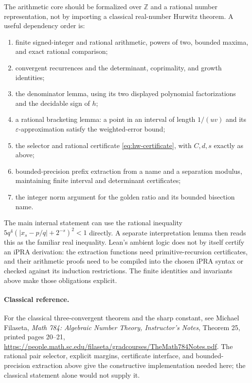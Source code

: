 The arithmetic core should be formalized over \(\mathbb Z\) and a rational
number representation, not by importing a classical real-number Hurwitz
theorem.  A useful dependency order is:
\begin{enumerate}
\item finite signed-integer and rational arithmetic, powers of two, bounded
      maxima, and exact rational comparison;
\item convergent recurrences and the determinant, coprimality, and growth
      identities;
\item the denominator lemma, using its two displayed polynomial
      factorizations and the decidable sign of \(h\);
\item a rational bracketing lemma: a point in an interval of length \(1/(uv)\)
      and its \(\varepsilon\)-approximation satisfy the weighted-error bound;
\item the selector and rational certificate \eqref{eq:hw-certificate}, with
      \(C,d,s\) exactly as above;
\item bounded-precision prefix extraction from a name and a separation
      modulus, maintaining finite interval and determinant certificates;
\item the integer norm argument for the golden ratio and its bounded
      bisection name.
\end{enumerate}
The main internal statement can use the rational inequality
\(5q^4(|x_s-p/q|+2^{-s})^2<1\) directly.  A separate interpretation lemma
then reads this as the familiar real inequality.  Lean's ambient logic does
not by itself certify an iPRA derivation: the extraction functions need
primitive-recursion certificates, and their arithmetic proofs need to be
compiled into the chosen iPRA syntax or checked against its induction
restrictions.  The finite identities and invariants above make those
obligations explicit.

\paragraph{Classical reference.}
For the classical three-convergent theorem and the sharp constant, see
Michael Filaseta, \emph{Math 784: Algebraic Number Theory, Instructor's Notes},
Theorem 25, printed pages 20--21,
\url{https://people.math.sc.edu/filaseta/gradcourses/TheMath784Notes.pdf}.
The rational pair selector, explicit margins, certificate interface, and
bounded-precision extraction above give the constructive implementation
needed here; the classical statement alone would not supply it.
